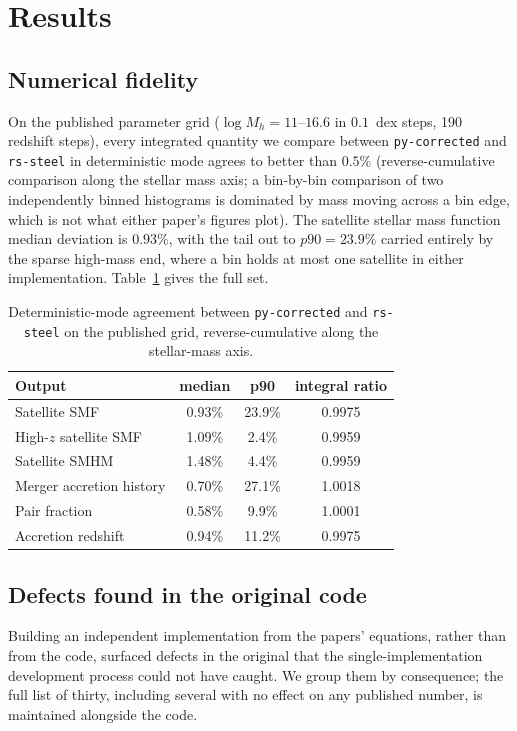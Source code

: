 \documentclass[fleqn,usenatbib]{mnras}
\begin{document}
\section{Results}
\label{sec:results}

\subsection{Numerical fidelity}

On the published parameter grid ($\log M_h = 11$--$16.6$ in $0.1$~dex
steps, 190 redshift steps), every integrated quantity we compare between
\texttt{py-corrected} and \texttt{rs-steel} in deterministic mode agrees
to better than $0.5\%$ (reverse-cumulative comparison along the stellar
mass axis; a bin-by-bin comparison of two independently binned
histograms is dominated by mass moving across a bin edge, which is not
what either paper's figures plot). The satellite stellar mass function
median deviation is $0.93\%$, with the tail out to $p90 = 23.9\%$ carried
entirely by the sparse high-mass end, where a bin holds at most one
satellite in either implementation. Table~\ref{tab:fidelity} gives the
full set.

\begin{table}
\centering
\caption{Deterministic-mode agreement between \texttt{py-corrected} and
\texttt{rs-steel} on the published grid, reverse-cumulative along the
stellar-mass axis.}
\label{tab:fidelity}
\begin{tabular}{lccc}
\hline
Output & median & p90 & integral ratio \\
\hline
Satellite SMF & 0.93\% & 23.9\% & 0.9975 \\
High-$z$ satellite SMF & 1.09\% & 2.4\% & 0.9959 \\
Satellite SMHM & 1.48\% & 4.4\% & 0.9959 \\
Merger accretion history & 0.70\% & 27.1\% & 1.0018 \\
Pair fraction & 0.58\% & 9.9\% & 1.0001 \\
Accretion redshift & 0.94\% & 11.2\% & 0.9975 \\
\hline
\end{tabular}
\end{table}

\subsection{Defects found in the original code}
\label{sec:bugs}

Building an independent implementation from the papers' equations, rather
than from the code, surfaced defects in the original that the
single-implementation development process could not have caught. We
group them by consequence; the full list of thirty, including several
with no effect on any published number, is maintained alongside the code.
\end{document}
